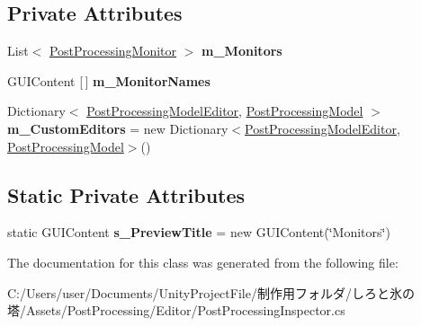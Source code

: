 \subsection*{Private Attributes}
\begin{DoxyCompactItemize}
\item 
\mbox{\label{class_unity_editor_1_1_post_processing_1_1_post_processing_inspector_a3eb98204f024d39913f64e643ff10387}} 
List$<$ \hyperlink{class_unity_editor_1_1_post_processing_1_1_post_processing_monitor}{Post\+Processing\+Monitor} $>$ {\bfseries m\+\_\+\+Monitors}
\item 
\mbox{\label{class_unity_editor_1_1_post_processing_1_1_post_processing_inspector_a01789a90acdd50fdc8365d3fc94221f0}} 
G\+U\+I\+Content \mbox{[}$\,$\mbox{]} {\bfseries m\+\_\+\+Monitor\+Names}
\item 
\mbox{\label{class_unity_editor_1_1_post_processing_1_1_post_processing_inspector_af1f3e3749327ff3d6ed7437a4f8598fa}} 
Dictionary$<$ \hyperlink{class_unity_editor_1_1_post_processing_1_1_post_processing_model_editor}{Post\+Processing\+Model\+Editor}, \hyperlink{class_unity_engine_1_1_post_processing_1_1_post_processing_model}{Post\+Processing\+Model} $>$ {\bfseries m\+\_\+\+Custom\+Editors} = new Dictionary$<$\hyperlink{class_unity_editor_1_1_post_processing_1_1_post_processing_model_editor}{Post\+Processing\+Model\+Editor}, \hyperlink{class_unity_engine_1_1_post_processing_1_1_post_processing_model}{Post\+Processing\+Model}$>$()
\end{DoxyCompactItemize}
\subsection*{Static Private Attributes}
\begin{DoxyCompactItemize}
\item 
\mbox{\label{class_unity_editor_1_1_post_processing_1_1_post_processing_inspector_a5746e3a6012bffaf9eaa59b53b3460ab}} 
static G\+U\+I\+Content {\bfseries s\+\_\+\+Preview\+Title} = new G\+U\+I\+Content(\char`\"{}Monitors\char`\"{})
\end{DoxyCompactItemize}


The documentation for this class was generated from the following file\+:\begin{DoxyCompactItemize}
\item 
C\+:/\+Users/user/\+Documents/\+Unity\+Project\+File/制作用フォルダ/しろと氷の塔/\+Assets/\+Post\+Processing/\+Editor/Post\+Processing\+Inspector.\+cs\end{DoxyCompactItemize}
